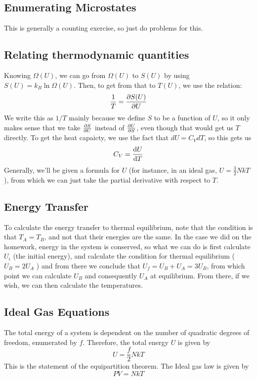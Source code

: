 \documentclass[10pt]{article}
\begin{document}
	\subsection{Enumerating Microstates} 
	This is generally a counting exercise, so just do problems for this.
	\subsection{Relating thermodynamic quantities}
	Knowing \( \Omega(U) \), we can go from \( \Omega(U) \) to \( S(U) \) by using \( S(U) = k_B \ln \Omega(U) \). Then, to get 
	from that to \( T(U) \), we use the relation:
	\[
		\frac{1}{T} = \pdv{S(U)}{U} 
	\] 
	We write this as \( 1 / T \) mainly because we define \( S  \) to be a function of \( U \), so it only makes sense that we take 
	\( \pdv{S}{U} \) instead of \( \pdv{U}{S} \), even though that would get us \( T \) directly. To get the heat capaicty, 
	we use the fact that \( dU = C_V dT \), so this gets us 
	\[
		C_V = \dv{U}{T}
	\] 
	Generally, we'll be given a formula for \( U \) (for instance, in an ideal gas, \( U = \frac{3}{2}NkT \) ), from which 
	we can just take the partial derivative with respect to \( T \).
	\subsection{Energy Transfer}
	To calculate the energy transfer to thermal equilibrium, note that the condition is that \( T_A = T_B \), and not that their 
	energies are the same. In the case we did on the homework, energy in the system is conserved, so what we can do is 
	first calculate \( U_i \) (the initial energy), and calculate the condition for thermal equilibrium (\( U_B = 2U_A \) )
	and from there we conclude that \( U_f = U_B + U_A = 3U_B \), from which point we can calculate \( U_B \) and 
	consequently \( U_A \) at equilibrium. From there, if we wish, we can then calculate the temperatures. 

	\subsection{Ideal Gas Equations}
	The total energy of a system is dependent on the number of quadratic degrees of freedom, enumerated by \( f \). Therefore, 
	the total energy \( U  \) is given by 
	\[
	U = \frac{f}{2}NkT
	\] 
	This is the statement of the equipartition theorem. The Ideal gas law is given by 
	\[
	PV = NkT
	\] 
\end{document}
